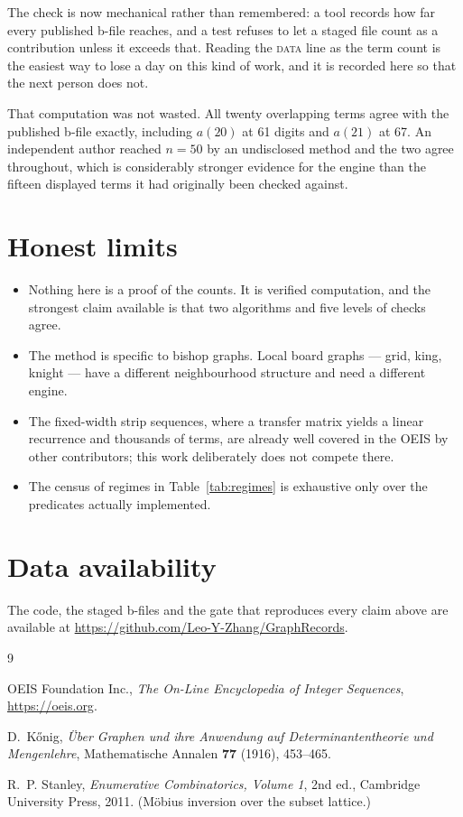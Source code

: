 \documentclass[11pt]{article}
\theoremstyle{remark}
\begin{document}
The check is now mechanical rather than remembered: a tool records how far every
published b-file reaches, and a test refuses to let a staged file count as a
contribution unless it exceeds that. Reading the \textsc{data} line as the term
count is the easiest way to lose a day on this kind of work, and it is recorded
here so that the next person does not.

That computation was not wasted. All twenty overlapping terms agree with the
published b-file exactly, including $a(20)$ at 61 digits and $a(21)$ at 67. An
independent author reached $n=50$ by an undisclosed method and the two agree
throughout, which is considerably stronger evidence for the engine than the
fifteen displayed terms it had originally been checked against.

\section{Honest limits}

\begin{itemize}
\item Nothing here is a proof of the counts. It is verified computation, and the
strongest claim available is that two algorithms and five levels of checks
agree.
\item The method is specific to bishop graphs. Local board graphs --- grid, king,
knight --- have a different neighbourhood structure and need a different engine.
\item The fixed-width strip sequences, where a transfer matrix yields a linear
recurrence and thousands of terms, are already well covered in the OEIS by other
contributors; this work deliberately does not compete there.
\item The census of regimes in Table~\ref{tab:regimes} is exhaustive only over
the predicates actually implemented.
\end{itemize}

\section*{Data availability}

The code, the staged b-files and the gate that reproduces every claim above are
available at
\url{https://github.com/Leo-Y-Zhang/GraphRecords}.

\begin{thebibliography}{9}

OEIS Foundation Inc., \emph{The On-Line Encyclopedia of Integer Sequences},
\url{https://oeis.org}.

D.~K\H{o}nig,
\emph{\"Uber Graphen und ihre Anwendung auf Determinantentheorie und
Mengenlehre},
Mathematische Annalen \textbf{77} (1916), 453--465.

R.~P. Stanley,
\emph{Enumerative Combinatorics, Volume 1}, 2nd ed.,
Cambridge University Press, 2011.
(M\"obius inversion over the subset lattice.)

\end{thebibliography}
\end{document}
